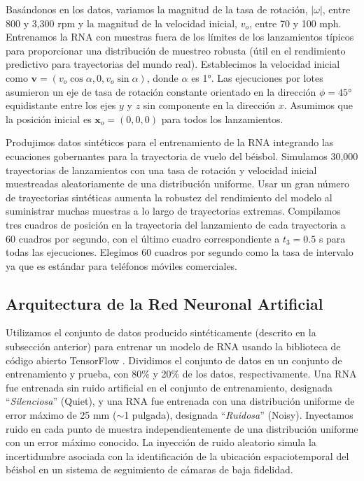 \documentclass[12pt,a4paper]{article}
\begin{document}
Basándonos en los datos, variamos la magnitud de la tasa de rotación, $|\omega|$, entre 800 y 3,300 rpm y la magnitud de la velocidad inicial, $v_o$, entre 70 y 100 mph. Entrenamos la RNA con muestras fuera de los límites de los lanzamientos típicos para proporcionar una distribución de muestreo robusta (útil en el rendimiento predictivo para trayectorias del mundo real). Establecimos la velocidad inicial como $\mathbf{v} = (v_o \cos\alpha, 0, v_o \sin\alpha)$, donde $\alpha$ es 1°. Las ejecuciones por lotes asumieron un eje de tasa de rotación constante orientado en la dirección $\phi = 45°$ equidistante entre los ejes $y$ y $z$ sin componente en la dirección $x$. Asumimos que la posición inicial es $\mathbf{x}_o = (0, 0, 0)$ para todos los lanzamientos.

Produjimos datos sintéticos para el entrenamiento de la RNA integrando las ecuaciones gobernantes para la trayectoria de vuelo del béisbol. Simulamos 30,000 trayectorias de lanzamientos con una tasa de rotación y velocidad inicial muestreadas aleatoriamente de una distribución uniforme. Usar un gran número de trayectorias sintéticas aumenta la robustez del rendimiento del modelo al suministrar muchas muestras a lo largo de trayectorias extremas. Compilamos tres cuadros de posición en la trayectoria del lanzamiento de cada trayectoria a 60 cuadros por segundo, con el último cuadro correspondiente a $t_3 = 0.5$ s para todas las ejecuciones. Elegimos 60 cuadros por segundo como la tasa de intervalo ya que es estándar para teléfonos móviles comerciales.

\subsection{Arquitectura de la Red Neuronal Artificial}

Utilizamos el conjunto de datos producido sintéticamente (descrito en la subsección anterior) para entrenar un modelo de RNA usando la biblioteca de código abierto TensorFlow \citep{abadi2016}. Dividimos el conjunto de datos en un conjunto de entrenamiento y prueba, con 80\% y 20\% de los datos, respectivamente. Una RNA fue entrenada sin ruido artificial en el conjunto de entrenamiento, designada ``\textit{Silenciosa}'' (Quiet), y una RNA fue entrenada con una distribución uniforme de error máximo de 25 mm ($\sim$1 pulgada), designada ``\textit{Ruidosa}'' (Noisy). Inyectamos ruido en cada punto de muestra independientemente de una distribución uniforme con un error máximo conocido. La inyección de ruido aleatorio simula la incertidumbre asociada con la identificación de la ubicación espaciotemporal del béisbol en un sistema de seguimiento de cámaras de baja fidelidad.
\end{document}
